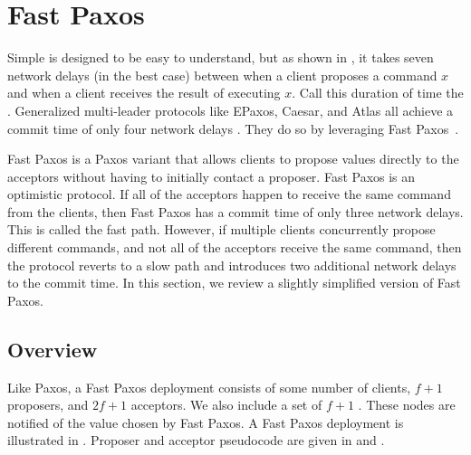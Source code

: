 \section{Fast Paxos}
{}
{}
{}

Simple \BPaxos{} is designed to be easy to understand, but as shown in
, it takes seven network delays (in the best case)
between when a client proposes a command $x$ and when a client receives the
result of executing $x$. Call this duration of time the .
Generalized multi-leader protocols like EPaxos, Caesar, and Atlas all achieve a
%
commit time of only four network delays . They
do so by leveraging Fast Paxos~\cite{lamport2006fast}.

Fast Paxos is a Paxos variant that allows clients to propose values directly to
the acceptors without having to initially contact a proposer. Fast Paxos is an
optimistic protocol. If all of the acceptors happen to receive the same command
from the clients, then Fast Paxos has a commit time of only three network
delays. This is called the fast path. However, if multiple clients concurrently
propose different commands, and not all of the acceptors receive the same
command, then the protocol reverts to a slow path and introduces two additional
network delays to the commit time.  In this section, we review a slightly
simplified version of Fast Paxos.

%
\subsection{Overview}
Like Paxos, a Fast Paxos deployment consists of some number of clients, $f+1$
proposers, and $2f+1$ acceptors. We also include a set of $f+1$
. These nodes are notified of the value chosen by Fast Paxos.
%
%
A Fast Paxos deployment is illustrated in . Proposer and
acceptor pseudocode are given in  and
.

